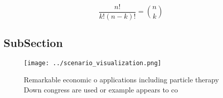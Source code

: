 \documentclass[a4paper]{article}
\begin{document}
\[ \frac{n!}{k!(n-k)!} = \binom{n}{k} \]

\subsection{SubSection}

\begin{figure}
\centering
\texttt{[image: ../scenario\_visualization.png]}
\caption{Remarkable economic o applications including particle therapy Down congress are used or example appears to co
}
\end{figure}
 
\end{document}
